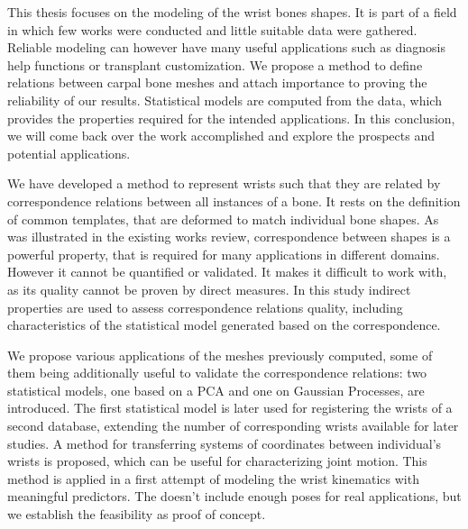 \documentclass[../../Main.tex]{subfiles}
\begin{document}
\relax

\begingroup


\TitleBtwLines

\clearpage
\setcounter{chapter}{2}
\renewcommand{\thechapter}{\Alph{chapter}}%

\label{chap:Conclusion}
\pagestyle{conclusionStyle}





This thesis focuses on the modeling of the wrist bones shapes. It is part of a field in which few works were conducted and little suitable data were gathered. Reliable modeling can however have many useful applications such as diagnosis help functions or transplant customization. We propose a method to define relations between carpal bone meshes and attach importance to proving the reliability of our results. Statistical models are computed from the data, which provides the properties required for the intended applications. In this conclusion, we will come back over the work accomplished and explore the prospects and potential applications. 


We have developed a method to represent wrists such that they are related by correspondence relations between all instances of a bone. It rests on the definition of common templates, that are deformed to match individual bone shapes. As was illustrated in the existing works review, correspondence between shapes is a powerful property, that is required for many applications in different domains. However it cannot be quantified or validated. It makes it difficult to work with, as its quality cannot be proven by direct measures. In this study indirect properties are used to assess correspondence relations quality, including characteristics of the statistical model generated based on the correspondence. 

We propose various applications of the meshes previously computed, some of them being additionally useful to validate the correspondence relations: two statistical models, one based on a PCA and one on Gaussian Processes, are introduced. The first statistical model is later used for registering the wrists of a second database, extending the number of corresponding wrists available for later studies. A method for transferring systems of coordinates between individual's wrists is proposed, which can be useful for characterizing joint motion. This method is applied in a first attempt of modeling the wrist kinematics with meaningful predictors. The \db* doesn't include enough poses for real applications, but we establish the feasibility as proof of concept. 
\end{document}
